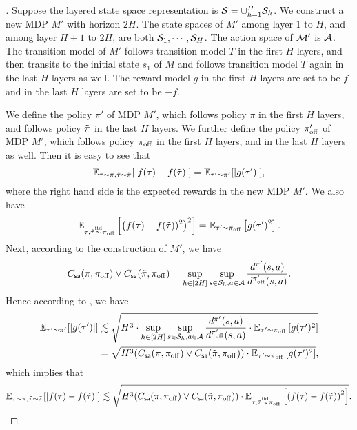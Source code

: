 \documentclass{article}
\begin{document}
\begin{proof}[]
    Suppose the layered state space representation is $\mathcal{S} = \cup_{h=1}^H \mathcal{S}_h$. We construct a new MDP $M'$ with horizon $2H$. The state spaces of $M'$ among layer $1$ to $H$, and among layer $H+1$ to $2H$, are both $\mathcal{S}_1, \cdots, \mathcal{S}_H$. The action space of $\mathcal{M}'$ is $\mathcal{A}$. The transition model of $M'$ follows transition model $T$ in the first $H$ layers, and then transits to the initial state $s_1$ of $M$ and follows transition model $T$ again in the last $H$ layers as well. The reward model $g$ in the first $H$ layers are set to be $f$ and in the last $H$ layers are set to be $-f$.

    We define the policy $\pi'$ of MDP $M'$, which follows policy $\pi$ in the first $H$ layers, and follows policy $\tilde{\pi}$ in the last $H$ layers. We further define the policy $\pi_{\mathrm{off}}'$ of MDP $M'$, which follows policy $\pi_{\mathrm{off}}$ in the first $H$ layers, and in the last $H$ layers as well. Then it is easy to see that 
    $$\mathbb{E}_{\tau\sim \pi, \tilde{\tau}\sim \tilde{\pi}}[|f(\tau) - f(\tilde{\tau})|] = \mathbb{E}_{\tau'\sim \pi'}[|g(\tau')|],$$
    where the right hand side is the expected rewards in the new MDP $M'$. We also have 
    $$\mathbb{E}_{\tau, \tilde{\tau}\stackrel{\mathrm{iid}}{\sim} \pi_{\mathrm{off}}} \left[\left(f(\tau) - f(\tilde{\tau}))^2\right)^2\right] = \mathbb{E}_{\tau'\sim \pi_{\mathrm{off}}} \left[g(\tau')^2\right].$$
    Next, according to the construction of $M'$, we have 
    $$C_{\mathsf{sa}}(\pi, \pi_{\mathrm{off}})\vee C_{\mathsf{sa}}(\tilde{\pi}, \pi_{\mathrm{off}}) = \sup_{h\in [2H]}\sup_{s\in \mathcal{S}_h, a\in \mathcal{A}} \frac{d^{\pi'}(s, a)}{d^{\pi_{\mathrm{off}}'}(s, a)}.$$
    Hence according to , we have 
    \begin{align*} 
        \mathbb{E}_{\tau'\sim \pi'}[|g(\tau')|] & \lesssim \sqrt{H^3\cdot \sup_{h\in [2H]}\sup_{s\in \mathcal{S}_h, a\in \mathcal{A}} \frac{d^{\pi'}(s, a)}{d^{\pi_{\mathrm{off}}'}(s, a)}\cdot \mathbb{E}_{\tau'\sim \pi_{\mathrm{off}}} \left[g(\tau')^2\right]}\\
        & = \sqrt{H^3(C_{\mathsf{sa}}(\pi, \pi_{\mathrm{off}})\vee C_{\mathsf{sa}}(\tilde{\pi}, \pi_{\mathrm{off}}))\cdot \mathbb{E}_{\tau'\sim \pi_{\mathrm{off}}} \left[g(\tau')^2\right]},
    \end{align*}
    which implies that 
    $$\mathbb{E}_{\tau\sim \pi, \tilde{\tau}\sim \tilde{\pi}}[|f(\tau) - f(\tilde{\tau})|] \lesssim \sqrt{H^3(C_{\mathsf{sa}}(\pi, \pi_{\mathrm{off}})\vee C_{\mathsf{sa}}(\tilde{\pi}, \pi_{\mathrm{off}}))\cdot \mathbb{E}_{\tau, \tilde{\tau}\stackrel{\mathrm{iid}}{\sim} \pi_{\mathrm{off}}} \left[\left(f(\tau) - f(\tilde{\tau})\right)^2\right]}.$$
\end{proof}
\end{document}
